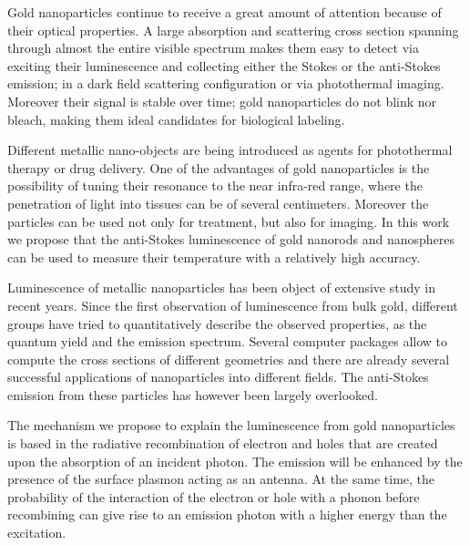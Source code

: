 Gold nanoparticles continue to receive a great amount of attention because of
their optical properties\cite{Zijlstra2011}. A large absorption and scattering
cross section spanning through almost the entire visible spectrum makes them
easy to detect via exciting their luminescence and collecting either the Stokes
or the anti-Stokes emission\cite{Jiang2013}; in a dark field
scattering\cite{Hu2008} configuration or via photothermal
imaging\cite{Berciaud2006}. Moreover their signal is stable over time; gold
nanoparticles do not blink nor bleach, making them ideal candidates for
biological labeling.

Different metallic nano-objects are being introduced as agents for photothermal
therapy or drug delivery\cite{Kang2013}. One of the advantages of gold
nanoparticles is the possibility of tuning their resonance to the near infra-red
range, where the penetration of light into tissues can be of several
centimeters\cite{Huang2006,Gobin2007,Hirsch2003,ONeal2004,Li2013c,Huang2008}.
Moreover the particles can be used not only for treatment, but also for imaging.
In this work we propose that the anti-Stokes luminescence of gold nanorods and
nanospheres can be used to measure their temperature with a relatively high
accuracy.

Luminescence of metallic nanoparticles has been object of extensive study in
recent years. Since the first observation of luminescence from bulk
gold\cite{Mooradian1969}, different groups have tried to quantitatively describe
the observed properties\cite{Mohamed2000,Beversluis2003a}, as the quantum
yield\cite{Fang2012,Rao2015,Yorulmaz2012,Cheng2015} and the emission
spectrum\cite{Link2010}. Several computer packages\cite{Yurkin2011} allow to
compute the cross sections of different geometries and there are already several successful
applications of nanoparticles into different fields. The anti-Stokes emission
from these particles has however been largely overlooked.

The mechanism we propose to explain the luminescence from gold nanoparticles is
based in the radiative recombination of electron and holes that are created upon
the absorption of an incident photon\cite{Dulkeith2004,Mooradian1969}. The
emission will be enhanced by the presence of the surface plasmon acting as an
antenna\cite{Mohamed2000}. At the same time, the probability of the interaction
of the electron or hole with a phonon before recombining can give rise to an
emission photon with a higher energy than the
excitation\cite{Hodak2000,Giri2015,Arbouet2003a}.

